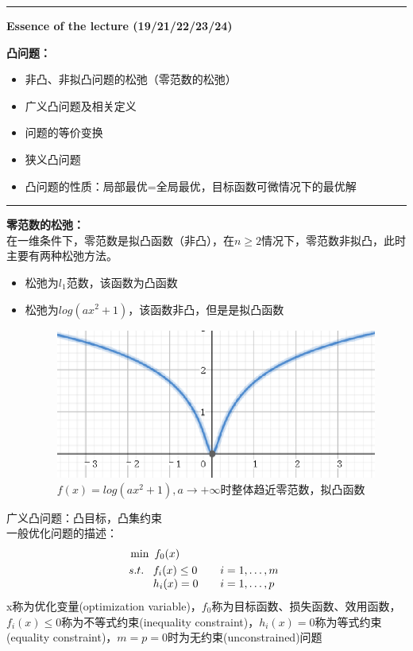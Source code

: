\documentclass[11pt]{ctexart}         %
\newcommand{\rebacklinespread}[1][-12pt]{\vspace{#1}}
\begin{document}
\hrule height 4pt
\begin{Large}
	\textbf{Essence of the lecture (19/21/22/23/24)}\\
\end{Large}
\begin{large}
	\textbf{凸问题：} 
\end{large}
\vspace{-16pt}
\begin{itemize} \setlength{\itemsep}{0pt}
	\item 非凸、非拟凸问题的松弛（零范数的松弛）
	\item 广义凸问题及相关定义
	\item 问题的等价变换
	\item 狭义凸问题
	\item 凸问题的性质：局部最优=全局最优，目标函数可微情况下的最优解
\end{itemize}
\hrule height 4pt

\textbf{零范数的松弛：}\\
在一维条件下，零范数是拟凸函数（非凸），在$ n\geq 2 $情况下，零范数非拟凸，此时主要有两种松弛方法。
\rebacklinespread
\begin{itemize}\setlength{\itemsep}{0pt}
	\item 松弛为$l_1$范数，该函数为凸函数
	\item 松弛为$ log(ax^2+1) $，该函数非凸，但是是拟凸函数
	\begin{figure}[h]
		\centering
		\includegraphics{imgs/logax.eps}
		\caption{$ f(x)=log(ax^2+1),a\to +\infty$时整体趋近零范数，拟凸函数}
	\end{figure}
	\rebacklinespread
\end{itemize}
\rebacklinespread
广义凸问题：凸目标，凸集约束\\
一般优化问题的描述：
\rebacklinespread
\begin{align*}
	&\min\ f_0(x)\\& s.t.\ 
	\begin{array}[t]{ll}%
		f_i(x)\leq 0\quad &i=1,\dots,m\\
		h_i(x)=0\quad &i=1,\dots,p
	\end{array}
\end{align*}
x称为优化变量(optimization variable)，$ f_0 $称为目标函数、损失函数、效用函数，$ f_i(x)\leq 0 $称为不等式约束(inequality constraint)，$ h_i(x)=0 $称为等式约束(equality constraint)，$ m=p=0 $时为无约束(unconstrained)问题
\end{document}

